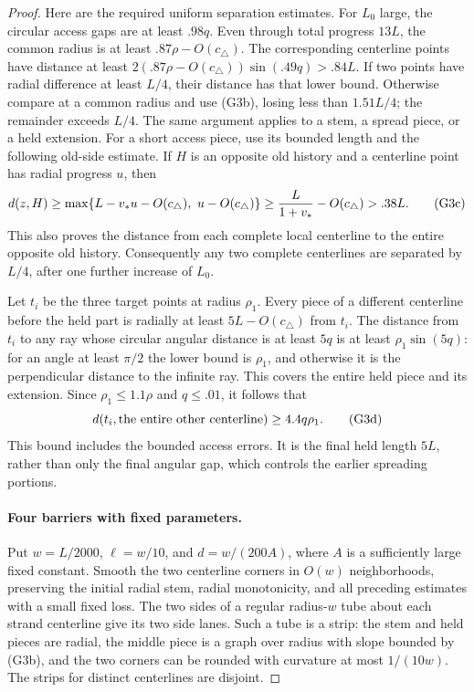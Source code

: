\begin{proof}
Here are the required uniform separation estimates.  For \(L_0\) large,
the circular access gaps are at least \(.98q\).  Even through total
progress \(13L\), the common radius is at least \(.87\rho-O(c_\triangle)\).
The corresponding centerline points have distance at least
\(2(.87\rho-O(c_\triangle))\sin(.49q)>.84L\).
If two points have radial difference at least \(L/4\), their distance
has that lower bound.  Otherwise compare at a common radius and use
(G3b), losing less than \(1.51L/4\); the remainder exceeds \(L/4\).
The same argument applies to a stem, a spread piece, or a held extension.
For a short access piece, use its bounded length and the following
old-side estimate.  If \(H\) is an opposite old history and a centerline
point has radial progress \(u\), then
\[
 d(z,H)\ge\max\{L-v_*u-O(c_\triangle),\ u-O(c_\triangle)\}
       \ge {L\over1+v_*}-O(c_\triangle)>.38L.                \tag{G3c}
\]
This also proves the distance from each complete local centerline to the
entire opposite old history.  Consequently any two complete centerlines
are separated by \(L/4\), after one further increase of \(L_0\).

Let \(t_i\) be the three target points at radius \(\rho_1\).  Every
piece of a different centerline before the held part is radially at least
\(5L-O(c_\triangle)\) from \(t_i\).  The distance from \(t_i\) to any
ray whose circular angular distance is at least \(5q\) is at least
\(\rho_1\sin(5q)\): for an angle at least \(\pi/2\) the lower bound
is \(\rho_1\), and otherwise it is the perpendicular distance to the
infinite ray.  This covers the entire held piece and its extension.
Since \(\rho_1\le1.1\rho\) and \(q\le.01\), it follows that
\[
 d(t_i,\hbox{the entire other centerline})
       \ge4.4q\rho_1.                                      \tag{G3d}
\]
This bound includes the bounded access errors.  It is the final held
length \(5L\), rather than only the final angular gap, which controls
the earlier spreading portions.

\paragraph{Four barriers with fixed parameters.}
Put \(w=L/2000\), \(\ell=w/10\), and \(d=w/(200A)\), where \(A\)
is a sufficiently large fixed constant.  Smooth the two centerline
corners in \(O(w)\) neighborhoods, preserving the initial radial stem,
radial monotonicity, and all preceding estimates with a small fixed loss.
The two sides of a regular radius-\(w\) tube about each strand centerline
give its two side lanes.  Such a tube is a strip: the stem and held pieces
are radial, the middle piece is a graph over radius with slope bounded
by (G3b), and the two corners can be rounded with curvature at most
\(1/(10w)\).  The strips for distinct centerlines are disjoint.


\end{proof}
